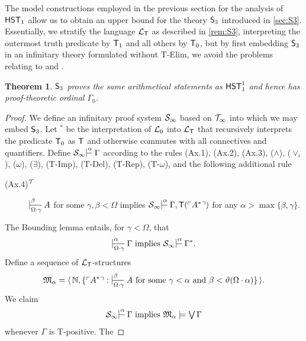 \documentclass[UKenglish,cleveref,DIV=12]{scrartcl}
\newtheorem{theorem}{Theorem}[section]
\theoremstyle{definition}
\theoremstyle{definition}
\begin{document}
The model constructions employed in the previous section for the analysis of $\mathsf{HST}_1$
allow us to obtain an upper bound for the theory $\mathsf{S}_3$ introduced in
\cref{sec:S3}. Essentially, we stratify the language $\mathcal{L}_{\mathsf{T}}$ as described in
\cref{rem:S3}, interpreting the outermost truth predicate by $\mathsf{T}_1$ and all
others by $\mathsf{T}_0$, but by first embedding $\mathsf{S}_3$ in an infinitary theory
formulated without T-Elim, we avoid the problems relating to  and
.
\begin{theorem}\label{thm:S3strength}
 $\mathsf{S}_3$ proves the same arithmetical statements as $\mathsf{HST}_1^1$ and hence has
proof-theoretic ordinal $\Gamma_0$.
\end{theorem}
\begin{proof}
We define an infinitary proof system $\mathcal{S}_\infty$ based on $\mathcal{T}_\infty$ into
which we may embed $\mathsf{S}_3$. Let $^*$ be the interpretation of $\mathcal{L}_0$ into
$\mathcal{L}_{\mathsf{T}}$ that recursively interprets the predicate $\mathsf{T}_0$ as $\mathsf{T}$ and otherwise
commutes with all connectives and quantifiers. Define $\theoryinf
S\prv\alpha{}\Gamma$ according to the rules (Ax.1), (Ax.2), (Ax.3),
($\land$), ($\lor_i$), ($\omega$), ($\exists$), (T-Imp), (T-Del), (T-Rep), (T-$\omega$), and
the following additional rule
\begin{description}
 \item [\normalfont(Ax.4)$^{\mathcal{T}}$] $\prv\beta{\Omega\cdot\gamma} A$ for some $\gamma,\beta<\Omega$
  implies $\theoryinf S\prv\alpha{}{\Gamma,\T(\gn{A^*})}$ for any \linebreak$\alpha>\max\{\beta,\gamma\}$.
\end{description}
The Bounding lemma entails, for $\gamma<\Omega$, that
\begin{align}\label{eqn:S81}
  \prv\alpha{\Omega\cdot\gamma}\Gamma\text{ implies }\theoryinf S\prv\alpha{}{\Gamma^*.}
\end{align}
%
Define a sequence of $\mathcal{L}_{\mathsf{T}}$-structures
\begin{align*}
  \mathfrak{M}_\alpha=\pair{\N,\{\gn {A^*}:\text{$\prv{\beta}{\Omega\cdot\gamma} A$ for some $\gamma<\alpha$ and $\beta<\vartheta(\Omega\cdot\alpha)$}\}}.
\end{align*}
We claim
\begin{align}\label{eqn:S82}
  \theoryinf S\prv\alpha{}\Gamma\text{ implies }\mathfrak{M}_\alpha\models\textstyle\bigvee\Gamma
\end{align}
whenever $\Gamma$ is T-positive. The

\end{proof}
\end{document}
